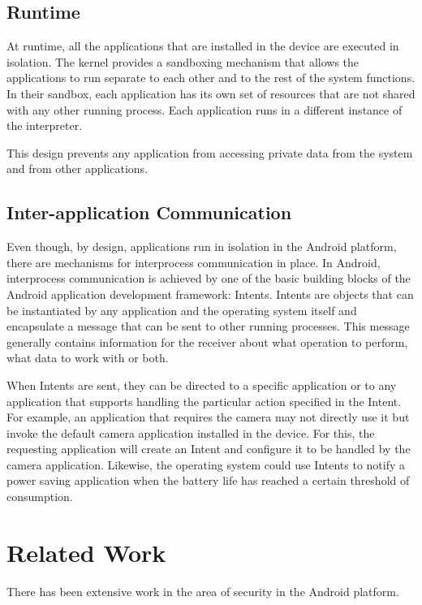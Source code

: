 \documentclass[conference]{IEEEtran}
\begin{document}
\subsection{Runtime}

At runtime, all the applications that are installed in the device are executed in isolation. The kernel provides a sandboxing mechanism that allows the applications to run separate to each other and to the rest of the system functions. In their sandbox, each application has its own set of resources that are not shared with any other running process. Each application runs in a different instance of the interpreter. 

This design prevents any application from accessing private data from the system and from other applications.

\subsection{Inter-application Communication}

Even though, by design, applications run in isolation in the Android platform, there are mechanisms for interprocess communication in place. In Android, interprocess communication is achieved by one of the basic building blocks of the Android application development framework: Intents. Intents are objects that can be instantiated by any application and the operating system itself and encapsulate a message that can be sent to other running processes. This message generally contains information for the receiver about what operation to perform, what data to work with or both.

When Intents are sent, they can be directed to a specific application or to any application that supports handling the particular action specified in the Intent. For example, an application that requires the camera may not directly use it but invoke the default camera application installed in the device. For this, the requesting application will create an Intent and configure it to be handled by the camera application. Likewise, the operating system could use Intents to notify a power saving application when the battery life has reached a certain threshold of consumption.

\section{Related Work}

There has been extensive work in the area of security in the Android platform. 
\end{document}
